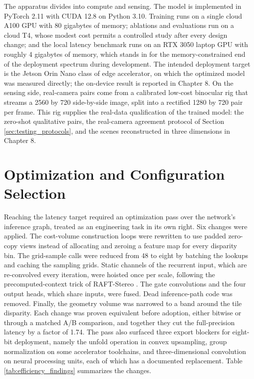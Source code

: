 The apparatus divides into compute and sensing. The model is implemented
in PyTorch 2.11 with CUDA 12.8 on Python 3.10. Training runs on a single
cloud A100 GPU with 80 gigabytes of memory; ablations and evaluations run
on a cloud T4, whose modest cost permits a controlled study after every
design change; and the local latency benchmark runs on an RTX 3050 laptop
GPU with roughly 4 gigabytes of memory, which stands in for the
memory-constrained end of the deployment spectrum during development. The
intended deployment target is the Jetson Orin Nano class of edge
accelerator, on which the optimized model was measured directly; the
on-device result is reported in Chapter 8. On the sensing side,
real-camera pairs come from a calibrated low-cost binocular rig that
streams a 2560 by 720 side-by-side image, split into a rectified 1280 by
720 pair per frame. This rig supplies the real-data qualification of the
trained model: the zero-shot qualitative pairs, the real-camera agreement
protocol of Section \ref{sec:testing_protocols}, and the scenes
reconstructed in three dimensions in Chapter 8.

\FloatBarrier
\section{Optimization and Configuration Selection}
Reaching the latency target required an optimization pass over the
network's inference graph, treated as an engineering task in its own
right. Six changes were applied. The cost-volume construction loops were
rewritten to use padded zero-copy views instead of allocating and zeroing
a feature map for every disparity bin. The grid-sample calls were reduced
from 48 to eight by batching the lookups and caching the sampling grids.
Static channels of the recurrent input, which are re-convolved every
iteration, were hoisted once per scale, following the precomputed-context
trick of RAFT-Stereo \cite{lipson2021raftstereo}. The gate convolutions
and the four output heads, which share inputs, were fused. Dead
inference-path code was removed. Finally, the geometry volume was narrowed
to a band around the tile disparity. Each change was proven equivalent
before adoption, either bitwise or through a matched A/B comparison, and
together they cut the full-precision latency by a factor of 1.74. The pass
also surfaced three export blockers for eight-bit deployment, namely the
unfold operation in convex upsampling, group normalization on some
accelerator toolchains, and three-dimensional convolution on neural
processing units, each of which has a documented replacement.
Table \ref{tab:efficiency_findings} summarizes the changes.

